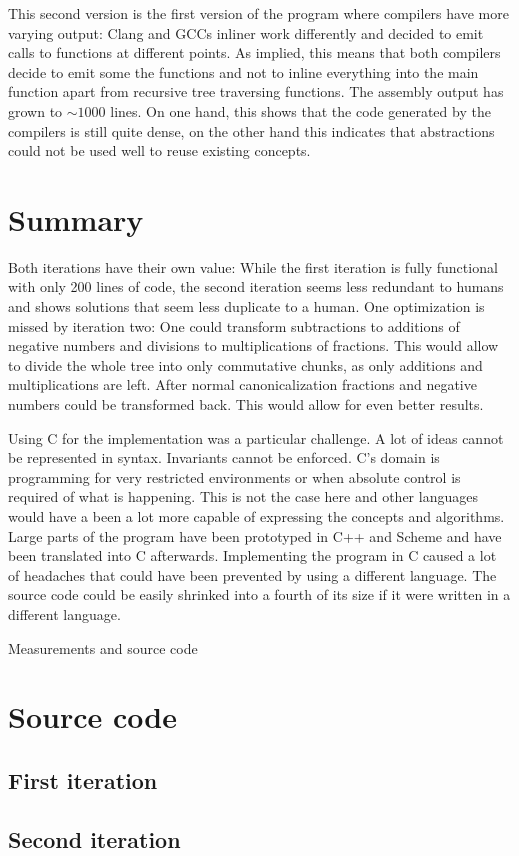 \documentclass[11pt,a4paper]{article}
\begin{document}
This second version is the first version of the program where
compilers have more varying output: Clang and GCCs inliner work
differently and decided to emit calls to functions at different
points. As implied, this means that both compilers decide to
emit some the functions and not to inline everything into the main
function apart from recursive tree traversing functions.
The assembly output has grown to $\sim 1000$ lines. On one hand, this
shows that the code generated by the compilers is still quite dense,
on the other hand this indicates that abstractions could not be used
well to reuse existing concepts.

\section{Summary}

Both iterations have their own value:
While the first iteration is fully functional with only 200 lines of
code, the second iteration seems less redundant to humans and shows
solutions that seem less duplicate to a human.
One optimization is missed by iteration two: One could transform
subtractions to additions of negative numbers and divisions to
multiplications of fractions.
This would allow to divide the whole tree into only commutative
chunks, as only additions and multiplications are left.
After normal canonicalization fractions and negative numbers could be
transformed back.
This would allow for even better results.

Using C for the implementation was a particular challenge.
A lot of ideas cannot be represented in syntax. Invariants cannot be
enforced. C's domain is programming for very restricted environments
or when absolute control is required of what is happening.
This is not the case here and other languages would have a been a lot
more capable of expressing the concepts and algorithms.
Large parts of the program have been prototyped in C++ and Scheme and
have been translated into C afterwards.
Implementing the program in C caused a lot of headaches that could
have been prevented by using a different language.
The source code could be easily shrinked into a fourth of its size if
it were written in a different language.




\FloatBarrier
\clearpage
\huge{Measurements and source code}

\section{Source code}
\label{sec:src}
\subsection{First iteration}



\subsection{Second iteration}


\end{document}
